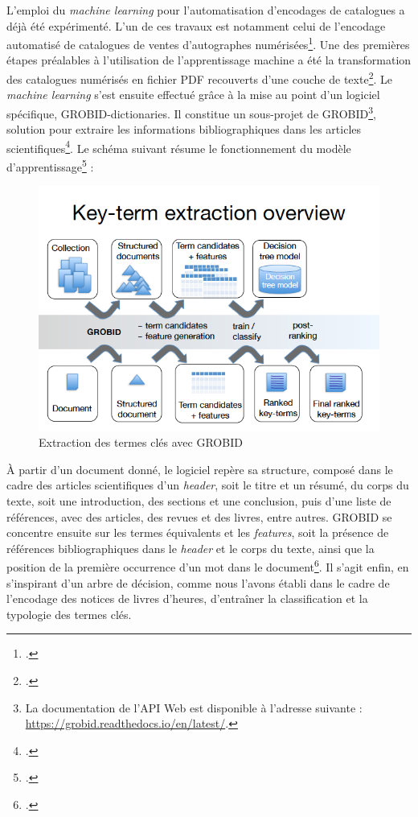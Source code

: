 \documentclass[a4paper,12pt,twoside]{book}
\begin{document}
	L'emploi du \textit{machine learning} pour l'automatisation d'encodages de catalogues a déjà été expérimenté. L'un de ces travaux est notamment celui de l'encodage automatisé de catalogues de ventes d'autographes numérisées\footcite{encoder_auto_catalogue}. Une des premières étapes préalables à l'utilisation de l'apprentissage machine a été la transformation des catalogues numérisés en fichier PDF recouverts d'une couche de texte\footcite[p. 31]{encoder_auto_catalogue}. Le \textit{machine learning} s'est ensuite effectué grâce à la mise au point d'un logiciel spécifique, GROBID-dictionaries. Il constitue un sous-projet de GROBID\footnote{La documentation de l'API Web est disponible à l'adresse suivante : \url{https://grobid.readthedocs.io/en/latest/}.}, solution pour extraire les informations bibliographiques dans les articles scientifiques\footcite{GROBID_Publi_Sc}. Le schéma suivant résume le fonctionnement du modèle d'apprentissage\footcite[p. 27]{Term_extraction_GROBID} : 
	\begin{figure}[!h]
    \centering
    \includegraphics[width=15cm]{img/GROBID/key_term_extraction_GROBID.png}
    \caption{Extraction des termes clés avec GROBID}
    \end{figure}
    
    À partir d'un document donné, le logiciel repère sa structure, composé dans le cadre des articles scientifiques d'un \textit{header}, soit le titre et un résumé, du corps du texte, soit une introduction, des sections et une conclusion, puis d'une liste de références, avec des articles, des revues et des livres, entre autres. GROBID se concentre ensuite sur les termes équivalents et les \textit{features}, soit la présence de références bibliographiques dans le \textit{header} et le corps du texte, ainsi que la position de la première occurrence d'un mot dans le document\footcite[p. 15]{GROBID_Publi_Sc}. Il s'agit enfin, en s'inspirant d'un arbre de décision, comme nous l'avons établi dans le cadre de l'encodage des notices de livres d'heures, d'entraîner la classification et la typologie des termes clés. 
	
\end{document}
